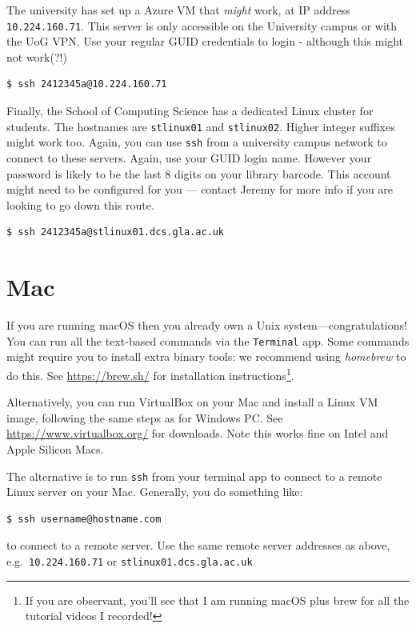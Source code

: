 \documentclass{article}
\begin{document}
The university has set up a Azure VM that \emph{might} work, at IP address
\texttt{10.224.160.71}. This server is only accessible on the University campus or with the UoG VPN.
Use your regular GUID credentials to login - although this might not work(?!)

\begin{lstlisting}[style=BashInputStyle]
  $ ssh 2412345a@10.224.160.71
\end{lstlisting}


Finally, the School of Computing Science has a dedicated Linux
cluster for students. The hostnames are \texttt{stlinux01} and
\texttt{stlinux02}. Higher integer suffixes might work too. Again,
you can use \texttt{ssh} from a university campus network to
connect to these servers. Again, use your GUID login name. However your password is likely to be the last 8 digits on your library barcode. This account might need to be configured for you --- contact Jeremy for more info if you are looking to go down this route.

\begin{lstlisting}[style=BashInputStyle]
  $ ssh 2412345a@stlinux01.dcs.gla.ac.uk
\end{lstlisting}


\section*{Mac}

If you are running macOS then you already own a Unix system---congratulations!
You can run all the text-based commands via the \texttt{Terminal}
app. Some commands might require you to install extra binary tools:
we recommend using \textit{homebrew} to do this. See \url{https://brew.sh/} for installation instructions\footnote{If
you are observant, you'll see that I am running macOS plus brew for all
the tutorial videos I recorded!}.

Alternatively, you can run VirtualBox on your Mac and install a
Linux VM image, following the same steps as for Windows PC.
See \url{https://www.virtualbox.org/} for downloads. Note this works fine
on Intel and Apple Silicon Macs.

The alternative is to run \texttt{ssh} from your terminal app
to connect to a remote Linux server on your Mac. Generally, you
do something like:

\begin{lstlisting}[style=BashInputStyle]
  $ ssh username@hostname.com
\end{lstlisting}

to connect to a remote server. Use the same remote server addresses as above, e.g.\ \texttt{10.224.160.71} or \texttt{stlinux01.dcs.gla.ac.uk}
\end{document}
